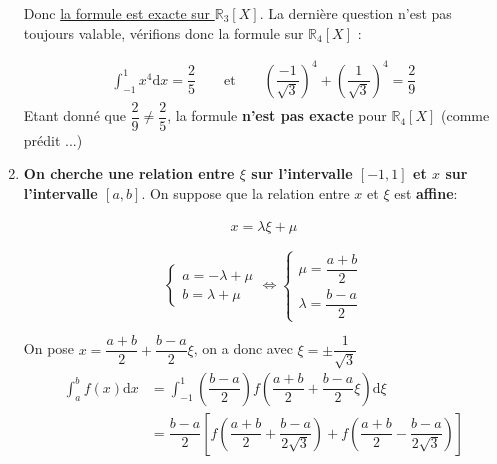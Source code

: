 \documentclass[12pt,a4paper]{article}
\begin{document}
\begin{enumerate}
Donc \underline{la formule est exacte sur $\mathbb{R}_3[X]$}. La dernière question n'est pas toujours valable, vérifions donc la formule sur $\mathbb{R}_4[X]$ : 

\begin{align*}
\int^1_{-1} x^4 \text{d}x = \dfrac{2}{5} \qquad \text{et} \qquad \left( \dfrac{-1}{\sqrt{3}}\right)^4 + \left( \dfrac{1}{\sqrt{3}}\right)^4 = \dfrac{2}{9}
\end{align*}
Etant donné que $\dfrac{2}{9}\neq \dfrac{2}{5}$, la formule \textbf{n'est pas exacte} pour $\mathbb{R}_4[X]$ (comme prédit ...)

\item \textbf{On cherche une relation entre $\xi$ sur l'intervalle $[-1,1]$ et $x$ sur l'intervalle $[a,b]$}. On suppose que la relation entre $x$ et $\xi$ est \textbf{affine}: 

\begin{align*}
x=\lambda \xi + \mu
\end{align*}



$$
\left\{
    \begin{array}{l}
        a= -\lambda + \mu   \\ 
		b=  \lambda + \mu 
    \end{array}
\right. 
\Longleftrightarrow
\left\{
    \begin{array}{ll}
        \mu = \dfrac{a+b}{2} \\ 
		\lambda = \dfrac{b-a}{2}
    \end{array}
\right.
$$



On pose $x = \dfrac{a+b}{2} + \dfrac{b-a}{2} \xi$, on a donc avec $\xi = \pm \dfrac{1}{\sqrt{3}} $
\begin{align*}
\int^b_a f(x) \text{d}x & = \int^1_{-1} \left( \dfrac{b-a}{2} \right) f\left( \dfrac{a+b}{2} + \dfrac{b-a}{2} \xi\right) \text{d}\xi \\
& = \dfrac{b-a}{2} \left[ f\left( \dfrac{a+b}{2} + \dfrac{b-a}{2\sqrt{3}}\right) + f\left( \dfrac{a+b}{2} - \dfrac{b-a}{2\sqrt{3}}\right) \right]
\end{align*}

\end{enumerate}
\end{document}
